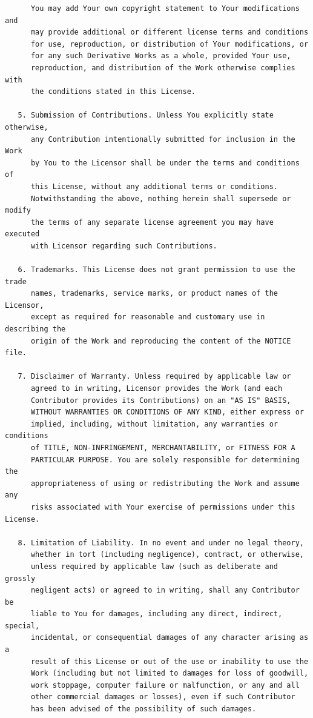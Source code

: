 \begin{verbatim}
      You may add Your own copyright statement to Your modifications and
      may provide additional or different license terms and conditions
      for use, reproduction, or distribution of Your modifications, or
      for any such Derivative Works as a whole, provided Your use,
      reproduction, and distribution of the Work otherwise complies with
      the conditions stated in this License.

   5. Submission of Contributions. Unless You explicitly state otherwise,
      any Contribution intentionally submitted for inclusion in the Work
      by You to the Licensor shall be under the terms and conditions of
      this License, without any additional terms or conditions.
      Notwithstanding the above, nothing herein shall supersede or modify
      the terms of any separate license agreement you may have executed
      with Licensor regarding such Contributions.

   6. Trademarks. This License does not grant permission to use the trade
      names, trademarks, service marks, or product names of the Licensor,
      except as required for reasonable and customary use in describing the
      origin of the Work and reproducing the content of the NOTICE file.

   7. Disclaimer of Warranty. Unless required by applicable law or
      agreed to in writing, Licensor provides the Work (and each
      Contributor provides its Contributions) on an "AS IS" BASIS,
      WITHOUT WARRANTIES OR CONDITIONS OF ANY KIND, either express or
      implied, including, without limitation, any warranties or conditions
      of TITLE, NON-INFRINGEMENT, MERCHANTABILITY, or FITNESS FOR A
      PARTICULAR PURPOSE. You are solely responsible for determining the
      appropriateness of using or redistributing the Work and assume any
      risks associated with Your exercise of permissions under this License.

   8. Limitation of Liability. In no event and under no legal theory,
      whether in tort (including negligence), contract, or otherwise,
      unless required by applicable law (such as deliberate and grossly
      negligent acts) or agreed to in writing, shall any Contributor be
      liable to You for damages, including any direct, indirect, special,
      incidental, or consequential damages of any character arising as a
      result of this License or out of the use or inability to use the
      Work (including but not limited to damages for loss of goodwill,
      work stoppage, computer failure or malfunction, or any and all
      other commercial damages or losses), even if such Contributor
      has been advised of the possibility of such damages.


\end{verbatim}
